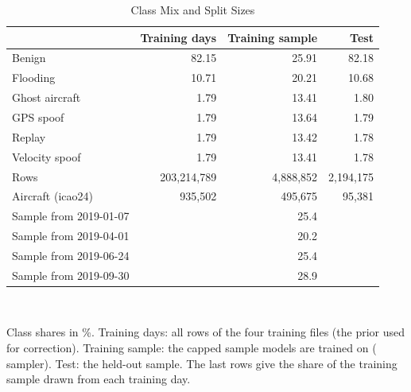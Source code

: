\begin{table}[t]
\centering
\footnotesize
\caption{Class Mix and Split Sizes}
\label{tab:mix}
\setlength{\tabcolsep}{4pt}
\begin{tabular}{lrrr}
\toprule
& Training days & Training sample & Test \\
\midrule
Benign & 82.15 & 25.91 & 82.18 \\
Flooding & 10.71 & 20.21 & 10.68 \\
Ghost aircraft & 1.79 & 13.41 & 1.80 \\
GPS spoof & 1.79 & 13.64 & 1.79 \\
Replay & 1.79 & 13.42 & 1.78 \\
Velocity spoof & 1.79 & 13.41 & 1.78 \\
\midrule
Rows & 203{,}214{,}789 & 4{,}888{,}852 & 2{,}194{,}175 \\
Aircraft (icao24) & 935{,}502 & 495{,}675 & 95{,}381 \\
\midrule
Sample from 2019-01-07 & & 25.4 & \\
Sample from 2019-04-01 & & 20.2 & \\
Sample from 2019-06-24 & & 25.4 & \\
Sample from 2019-09-30 & & 28.9 & \\
\bottomrule
\end{tabular}
\\[2pt]
\parbox{\linewidth}{\scriptsize Class shares in \%. Training days: all rows of the four training files (the prior used for correction). Training sample: the capped sample models are trained on ( sampler). Test: the held-out sample. The last rows give the share of the training sample drawn from each training day.}
\end{table}
